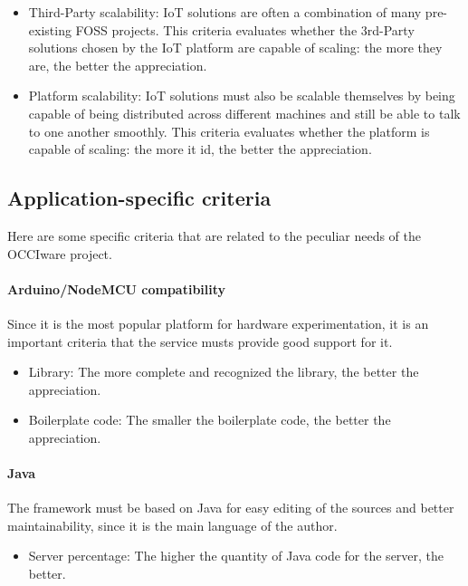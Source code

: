 \documentclass{article}
\begin{document}
\begin{itemize}
\item Third-Party scalability: IoT solutions are often a combination of many pre-existing FOSS projects. This criteria evaluates whether the 3rd-Party solutions chosen by the IoT platform are capable of scaling: the more they are, the better the appreciation.
\item Platform scalability: IoT solutions must also be scalable themselves by being capable of being distributed across different machines and still be able to talk to one another smoothly. This criteria evaluates whether the platform is capable of scaling: the more it id, the better the appreciation.
\end{itemize}

\subsection{Application-specific criteria}

Here are some specific criteria that are related to the peculiar needs of the OCCIware project.

\paragraph{Arduino/NodeMCU compatibility} Since it is the most popular platform for hardware experimentation, it is an important criteria that the service musts provide good support for it.

\begin{itemize}
\item Library: The more complete and recognized the library, the better the appreciation.
\item Boilerplate code: The smaller the boilerplate code, the better the appreciation.
\end{itemize}

\paragraph{Java} The framework must be based on Java for easy editing of the sources and better maintainability, since it is the main language of the author.

\begin{itemize}
\item Server percentage: The higher the quantity of Java code for the server, the better.
\end{itemize}
\end{document}
